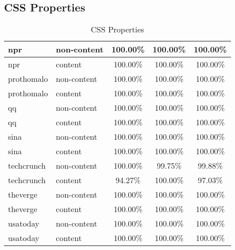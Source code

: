 \documentclass{acm_proc_article-sp}
\begin{document}
\subsection{CSS Properties}

\begin{table}
\centering
\caption{CSS Properties}
\begin{tabular}{|l|l|c|c|c|} \hline
npr&non-content&100.00\%&100.00\%&100.00\%\\ \hline
npr&content&100.00\%&100.00\%&100.00\%\\ \hline
prothomalo&non-content&100.00\%&100.00\%&100.00\%\\ \hline
prothomalo&content&100.00\%&100.00\%&100.00\%\\ \hline
qq&non-content&100.00\%&100.00\%&100.00\%\\ \hline
qq&content&100.00\%&100.00\%&100.00\%\\ \hline
sina&non-content&100.00\%&100.00\%&100.00\%\\ \hline
sina&content&100.00\%&100.00\%&100.00\%\\ \hline
techcrunch&non-content&100.00\%&99.75\%&99.88\%\\ \hline
techcrunch&content&94.27\%&100.00\%&97.03\%\\ \hline
theverge&non-content&100.00\%&100.00\%&100.00\%\\ \hline
theverge&content&100.00\%&100.00\%&100.00\%\\ \hline
usatoday&non-content&100.00\%&100.00\%&100.00\%\\ \hline
usatoday&content&100.00\%&100.00\%&100.00\%\\ \hline
\end{tabular}
\end{table}
\end{document}
